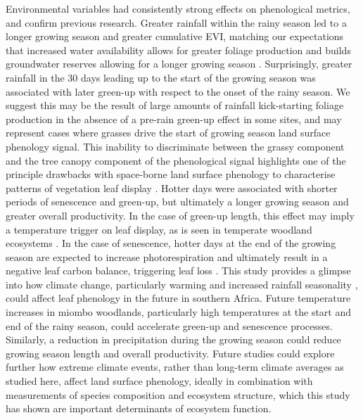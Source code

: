\documentclass[11pt,a4paper]{article}
\begin{document}
Environmental variables had consistently strong effects on phenological
metrics, and confirm previous research. Greater rainfall within the rainy
season led to a longer growing season and greater cumulative EVI, matching our
expectations that increased water availability allows for greater foliage
production and builds groundwater reserves allowing for a longer growing season
\citep{Adole2018b}. Surprisingly, greater rainfall in the 30 days leading up to
the start of the growing season was associated with later green-up with respect
to the onset of the rainy season. We suggest this may be the result of large
amounts of rainfall kick-starting foliage production in the absence of a
pre-rain green-up effect in some sites, and may represent cases where grasses
drive the start of growing season land surface phenology signal. This inability
to discriminate between the grassy component and the tree canopy component of
the phenological signal highlights one of the principle drawbacks with
space-borne land surface phenology to characterise patterns of vegetation leaf
display \citep{Archibald2007}. Hotter days were associated with shorter periods
of senescence and green-up, but ultimately a longer growing season and greater
overall productivity. In the case of green-up length, this effect may imply a
temperature trigger on leaf display, as is seen in temperate woodland
ecosystems \citep{Flynn2018}. In the case of senescence, hotter days at the end
of the growing season are expected to increase photorespiration and ultimately
result in a negative leaf carbon balance, triggering leaf loss
\citep{Warren2011, Marin2019}. This study provides a glimpse into how climate
change, particularly warming \citep{IPCC} and increased rainfall seasonality
\citep{Wainwright2021}, could affect leaf phenology in the future in southern
Africa. Future temperature increases in miombo woodlands, particularly high
temperatures at the start and end of the rainy season, could accelerate
green-up and senescence processes. Similarly, a reduction in precipitation
during the growing season could reduce growing season length and overall
productivity. Future studies could explore further how extreme climate events, rather than long-term climate averages as studied here, affect land surface
phenology, ideally in combination with measurements of species composition and
ecosystem structure, which this study has shown are important determinants of
ecosystem function. 
\end{document}
